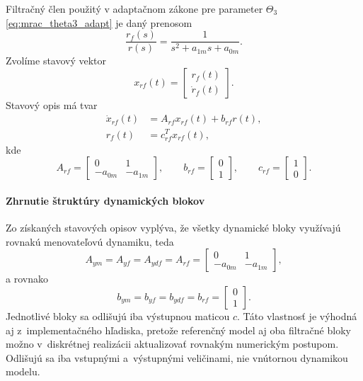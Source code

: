 Filtračný člen použitý v adaptačnom zákone
pre parameter $\Theta_3$
\eqref{eq:mrac_theta3_adapt}
je daný prenosom
\begin{equation}
	\frac{r_f(s)}{r(s)}
	=
	\frac{1}{s^2 + a_{1m}s + a_{0m}}.
\end{equation}
Zvolíme stavový vektor
\begin{equation}
	x_{rf}(t)
	=
	\begin{bmatrix}
		r_f(t) \\
		\dot{r}_f(t)
	\end{bmatrix}.
\end{equation}
Stavový opis má tvar
\begin{align}
	\dot{x}_{rf}(t)
	&=
	A_{rf} x_{rf}(t)
	+
	b_{rf} r(t),
	\\
	r_f(t)
	&=
	c_{rf}^{T} x_{rf}(t),
\end{align}
kde
\begin{equation}
	A_{rf}
	=
	\begin{bmatrix}
		0 & 1 \\
		- a_{0m} & - a_{1m}
	\end{bmatrix},
	\qquad
	b_{rf}
	=
	\begin{bmatrix}
		0 \\
		1
	\end{bmatrix},
	\qquad
	c_{rf}
	=
	\begin{bmatrix}
		1 \\
		0
	\end{bmatrix}.
\end{equation}


\paragraph{Zhrnutie štruktúry dynamických blokov}

Zo získaných stavových opisov vyplýva, že všetky dynamické bloky
využívajú rovnakú menovateľovú dynamiku, teda
\begin{equation}
	A_{ym} = A_{yf} = A_{ydf} = A_{rf}
	=
	\begin{bmatrix}
		0 & 1 \\
		- a_{0m} & - a_{1m}
	\end{bmatrix},
\end{equation}
a rovnako
\begin{equation}
	b_{ym} = b_{yf} = b_{ydf} = b_{rf}
	=
	\begin{bmatrix}
		0 \\
		1
	\end{bmatrix}.
\end{equation}
Jednotlivé bloky sa odlišujú iba výstupnou maticou $c$.
Táto vlastnosť je výhodná aj z~implementačného hľadiska, pretože
referenčný model aj oba filtračné bloky možno v~diskrétnej realizácii
aktualizovať rovnakým numerickým postupom. Odlišujú sa iba vstupnými
a~výstupnými veličinami, nie vnútornou dynamikou modelu.

